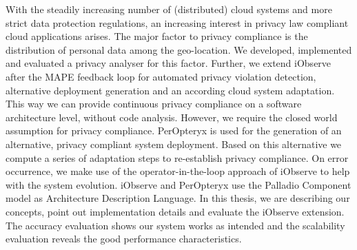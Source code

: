 
\Abstract

With the steadily increasing number of (distributed) cloud systems and more strict data protection regulations, an increasing interest in privacy law compliant cloud applications arises. The major factor to privacy compliance is the distribution of personal data among the geo-location. We developed, implemented and evaluated a privacy analyser for this factor. Further, we extend iObserve after the MAPE feedback loop for automated privacy violation detection, alternative deployment generation and an according cloud system adaptation. This way we can provide continuous privacy compliance on a software architecture level, without code analysis. However, we require the closed world assumption for privacy compliance. PerOpteryx is used for the generation of an alternative, privacy compliant system deployment. Based on this alternative we compute a series of adaptation steps to re-establish privacy compliance. On error occurrence, we make use of the operator-in-the-loop approach of iObserve to help with the system evolution. iObserve and PerOpteryx use the Palladio Component model as Architecture Description Language. In this thesis, we are describing our concepts, point out implementation details and evaluate the iObserve extension. The accuracy evaluation shows our system works as intended and the scalability evaluation reveals the good performance characteristics.